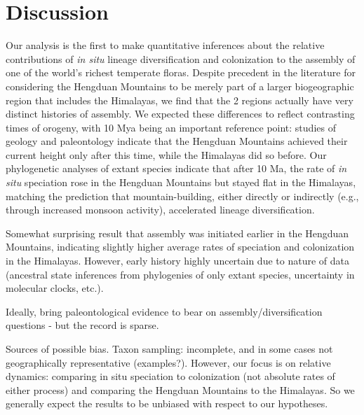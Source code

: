 \section{Discussion}

Our analysis is the first to make quantitative inferences about the relative contributions of \textit{in situ} lineage diversification and colonization to the assembly of one of the world's richest temperate floras. Despite precedent in the literature for considering the Hengduan Mountains to be merely part of a larger biogeographic region that includes the Himalayas, we find that the 2 regions actually have very distinct histories of assembly. We expected these differences to reflect contrasting times of orogeny, with 10 Mya being an important reference point: studies of geology and paleontology indicate that the Hengduan Mountains achieved their current height only after this time, while the Himalayas did so before. Our phylogenetic analyses of extant species indicate that after 10 Ma, the rate of \textit{in situ} speciation rose in the Hengduan Mountains but stayed flat in the Himalayas, matching the prediction that mountain-building, either directly or indirectly (e.g., through increased monsoon activity), accelerated lineage diversification.

Somewhat surprising result that assembly was initiated earlier in the Hengduan Mountains, indicating slightly higher average rates of speciation and colonization in the Himalayas. However, early history highly uncertain due to nature of data (ancestral state inferences from phylogenies of only extant species, uncertainty in molecular clocks, etc.).

Ideally, bring paleontological evidence to bear on assembly/diversification questions - but the record is sparse.

Sources of possible bias. Taxon sampling: incomplete, and in some cases not geographically representative (examples?). However, our focus is on relative dynamics: comparing in situ speciation to colonization (not absolute rates of either process) and comparing the Hengduan Mountains to the Himalayas. So we generally expect the results to be unbiased with respect to our hypotheses. 

